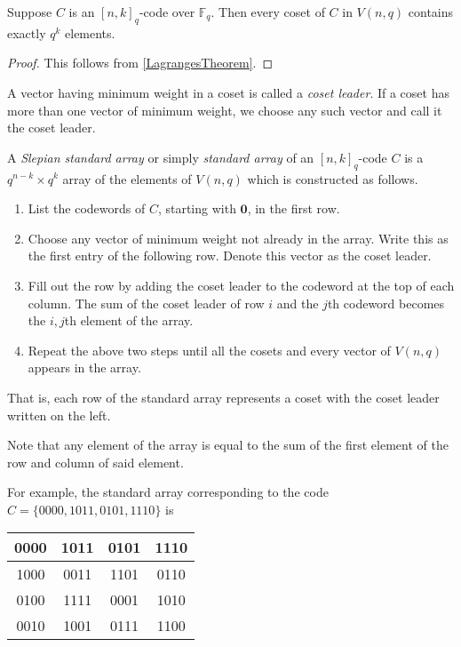 \begin{theorem}
    Suppose $C$ is an $[n,k]_q$-code over $\mathbb{F}_q$. Then every coset of $C$ in $V(n,q)$ contains exactly $q^k$ elements.
\end{theorem}
\begin{proof}
    This follows from \ref{LagrangesTheorem}.
\end{proof}

\begin{definition}
    A vector having minimum weight in a coset is called a \textit{coset leader}. If a coset has more than one vector of minimum weight, we choose any such vector and call it the coset leader.
\end{definition}


A \textit{Slepian standard array} or simply \textit{standard array} of an $[n,k]_q$-code $C$ is a $q^{n-k}\times q^k$ array of the elements of $V(n,q)$ which is constructed as follows.
\begin{enumerate}
    \item List the codewords of $C$, starting with $\textbf{0}$, in the first row.
    \item Choose any vector of minimum weight not already in the array. Write this as the first entry of the following row. Denote this vector as the coset leader.
    \item Fill out the row by adding the coset leader to the codeword at the top of each column. The sum of the coset leader of row $i$ and the $j$th codeword becomes the $i,j$th element of the array.
    \item Repeat the above two steps until all the cosets and every vector of $V(n,q)$ appears in the array.
\end{enumerate}
That is, each row of the standard array represents a coset with the coset leader written on the left.

Note that any element of the array is equal to the sum of the first element of the row and column of said element.

For example, the standard array corresponding to the code $C=\{0000,1011,0101,1110\}$ is
\begin{center}
\begin{tabular}{|c|c|c|c|}
    \hline
     0000 & 1011 & 0101 & 1110 \\ \hline
     1000 & 0011 & 1101 & 0110 \\ \hline
     0100 & 1111 & 0001 & 1010 \\ \hline
     0010 & 1001 & 0111 & 1100 \\ \hline
\end{tabular}
\end{center}

